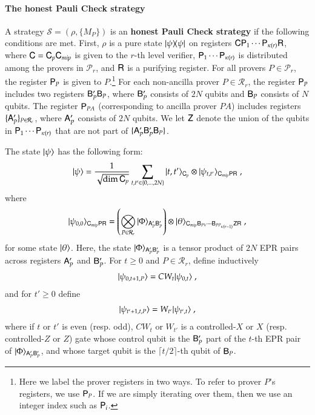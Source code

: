 \paragraph{The honest Pauli Check strategy}
A strategy $\mathcal{S} = (\rho,\{ M_P \})$ is an \textbf{honest Pauli Check strategy} if the following conditions are met. First, $\rho$ is a pure state $|\psi\rangle\! \langle \psi|$ on registers ${\mathsf{C}} {\mathsf{P}}_1 \cdots {\mathsf{P}}_{\kappa(r)} {\mathsf{R}}$, where ${\mathsf{C}} = {\mathsf{C}}_p {\mathsf{C}}_{mip}$ is given to the $r$-th level verifier, ${\mathsf{P}}_1 \cdots {\mathsf{P}}_{\kappa(r)}$ is distributed among the provers in $\mathcal{P}_r$, and ${\mathsf{R}}$ is a purifying register. For all provers $P \in \mathcal{P}_r$, the register ${\mathsf{P}}_P$ is given to $P$.\footnote{Here we label the prover registers in two ways. To refer to prover $P$'s registers, we use ${\mathsf{P}}_P$. If we are simply iterating over them, then we use an integer index such as ${\mathsf{P}}_i$.}  For each non-ancilla prover $P \in \mathcal{R}_r$, the register ${\mathsf{P}}_P$ includes two registers ${\mathsf{B}}'_P {\mathsf{B}}_P$, where ${\mathsf{B}}'_P$ consists of $2N$ qubits and ${\mathsf{B}}_P$ consists of $N$ qubits. The register ${\mathsf{P}}_{PA}$ (corresponding to ancilla prover $PA$) includes registers $\{ {\mathsf{A}}_P' \}_{P \in \mathcal{R}_r}$, where ${\mathsf{A}}_P'$ consists of $2N$ qubits. We let ${\mathsf{Z}}$ denote the union of the qubits in ${\mathsf{P}}_1 \cdots {\mathsf{P}}_{\kappa(r)}$ that are not part of $\{ {\mathsf{A}}_P' {\mathsf{B}}_P' {\mathsf{B}}_P \}$. 

The state $|\psi\rangle$ has the following form:
\begin{equation}
	\ket{\psi} = \frac{1}{\sqrt{\dim \sC_p}} \sum_{ t,t' \in \set{0,\ldots,2N} } \ket{t,t'}_{\sC_p} \otimes \ket{\psi_{t,t'}}_{\sC_{mip} \sP \sR}\;,
	\label{eq:honest-psi}
\end{equation}
where 
\[
	|\psi_{0,0}\rangle_{{\mathsf{C}}_{mip} {\mathsf{P}} {\mathsf{R}}} = \left( \bigotimes_{P \in \mathcal{R}_r} |\Phi\rangle_{{\mathsf{A}}_P' {\mathsf{B}}_P'}\right) \otimes |\theta\rangle_{{\mathsf{C}}_{mip} {\mathsf{B}}_{PV} \cdots {\mathsf{B}}_{PP_{\kappa(r-1)}} {\mathsf{Z}} {\mathsf{R}}}\;,
\]
for some state $|\theta\rangle$. Here, the state $|\Phi\rangle_{{\mathsf{A}}_P' {\mathsf{B}}_P'}$ is a tensor product of $2N$ EPR pairs across registers ${\mathsf{A}}_P'$ and ${\mathsf{B}}_P'$. For $t\geq 0$ and 
$P \in \mathcal{R}_r$, define inductively
\begin{align}
	|\psi_{0,t+1,P}\rangle =  CW_t |\psi_{0,t}\rangle \;,
\end{align}
and for $t' \geq 0$ define 
\begin{align}
	|\psi_{t'+1,t,P}\rangle =  W_{t'} |\psi_{t',t}\rangle \;,
\end{align}
where if $t$ or $t'$ is even (resp. odd), $CW_t$ or $W_{t'}$ is a controlled-$X$ or $X$ (resp. controlled-$Z$ or $Z$) gate whose control qubit is the ${\mathsf{B}}_P'$ part of the $t$-th EPR pair of $|\Phi\rangle_{{\mathsf{A}}_P' {\mathsf{B}}_P'}$, and whose target qubit is the $\lceil t/2\rceil$-th qubit of ${\mathsf{B}}_P$. 


